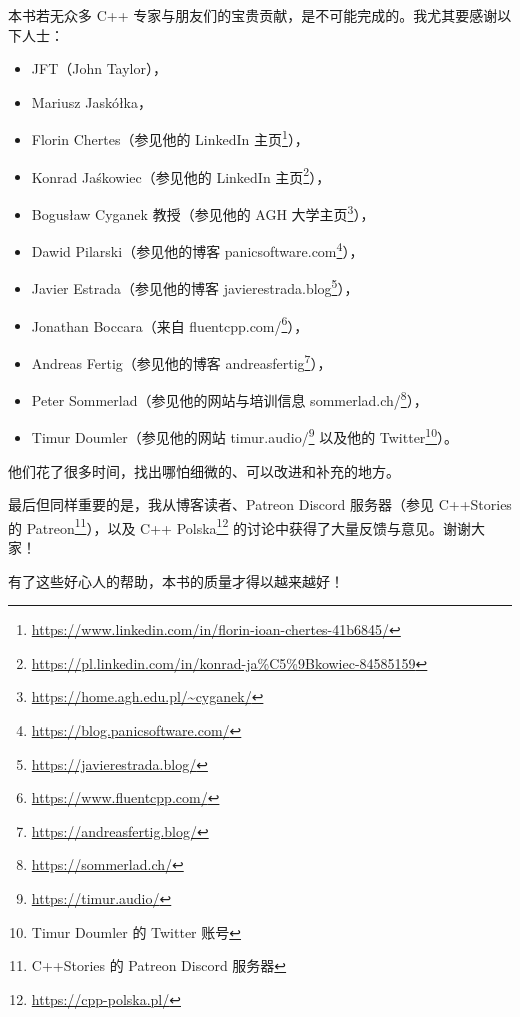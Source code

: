 本书若无众多 C++ 专家与朋友们的宝贵贡献，是不可能完成的。我尤其要感谢以下人士：

\begin{itemize}
\item JFT（John Taylor），
\item Mariusz Jaskółka，
\item Florin Chertes（参见他的 LinkedIn 主页\footnote{\url{https://www.linkedin.com/in/florin-ioan-chertes-41b6845/}}），
\item Konrad Jaśkowiec（参见他的 LinkedIn 主页\footnote{\url{https://pl.linkedin.com/in/konrad-ja\%C5\%9Bkowiec-84585159}}），
\item Bogusław Cyganek 教授（参见他的 AGH 大学主页\footnote{\url{https://home.agh.edu.pl/~cyganek/}}），
\item Dawid Pilarski（参见他的博客 panicsoftware.com\footnote{\url{https://blog.panicsoftware.com/}}），
\item Javier Estrada（参见他的博客 javierestrada.blog\footnote{\url{https://javierestrada.blog/}}），
\item Jonathan Boccara（来自 fluentcpp.com/\footnote{\url{https://www.fluentcpp.com/}}），
\item Andreas Fertig（参见他的博客 andreasfertig\footnote{\url{https://andreasfertig.blog/}}），
\item Peter Sommerlad（参见他的网站与培训信息 sommerlad.ch/\footnote{\url{https://sommerlad.ch/}}），
\item Timur Doumler（参见他的网站 timur.audio/\footnote{\url{https://timur.audio/}} 以及他的 Twitter\footnote{Timur Doumler 的 Twitter 账号}）。
\end{itemize}

他们花了很多时间，找出哪怕细微的、可以改进和补充的地方。

最后但同样重要的是，我从博客读者、Patreon Discord 服务器（参见 C++Stories 的 Patreon\footnote{C++Stories 的 Patreon Discord 服务器}），以及 C++ Polska\footnote{\url{https://cpp-polska.pl/}} 的讨论中获得了大量反馈与意见。谢谢大家！

有了这些好心人的帮助，本书的质量才得以越来越好！
